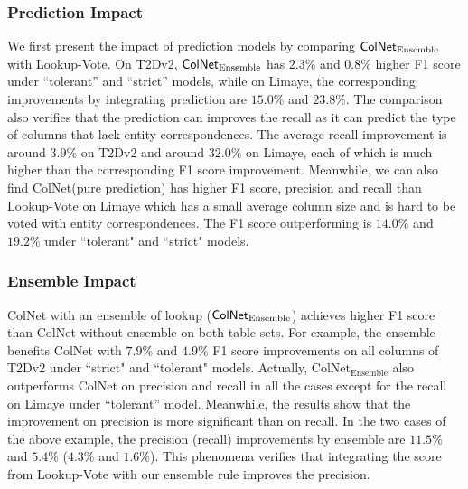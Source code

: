 \documentclass[letterpaper]{article}
\newcommand{\rv}[1]{{\color{black}#1}}
\newcommand{\ColNet}{\textsf{ColNet}\xspace}
\begin{document}
\subsubsection{Prediction Impact} 
\rv{
We first present the impact of prediction models by comparing $\text{\ColNet}_{\text{Ensemble}}$ with Lookup-Vote.
On T2Dv2, $\text{\ColNet}_{\text{Ensemble}}$ has $2.3\%$ and $0.8\%$ higher F1 score under ``tolerant'' and ``strict'' models,
while on Limaye, the corresponding improvements by integrating prediction are $15.0\%$ and $23.8\%$.
The comparison also verifies that the prediction can improves the recall as it can predict the type of columns that lack entity correspondences.
The average recall improvement is around $3.9\%$ on T2Dv2 
and around $32.0\%$ on Limaye,
each of which is much higher than the corresponding F1 score improvement.
}
\rv{
Meanwhile, we can also find \ColNet (pure prediction) has higher F1 score, precision and recall than Lookup-Vote on Limaye which has a small average column size and is hard to be voted with entity correspondences.
The F1 score outperforming is $14.0\%$ and $19.2\%$ under ``tolerant" and ``strict" models. 
}



\subsubsection{Ensemble Impact}
\ColNet with an ensemble of lookup \rv{($\text{\ColNet}_{\text{Ensemble}}$) achieves higher F1 score than \ColNet without ensemble on both table sets.
For example, the ensemble benefits \ColNet with $7.9\%$ and $4.9\%$} F1 score improvements on all columns of T2Dv2 under ``strict" and ``tolerant" models.
\rv{Actually, $\text{ColNet}_{\text{Ensemble}}$ also outperforms \ColNet on precision and recall in all the cases except for the recall on Limaye under ``tolerant'' model.}
\rv{Meanwhile, the results show that the improvement on precision is more significant than on recall.
In the two cases of the above example, 
the precision (recall)  improvements by ensemble are $11.5\%$ and $5.4\%$ ($4.3\%$ and $1.6\%$).
This phenomena verifies that integrating the score from Lookup-Vote with our ensemble rule improves the precision.}
\end{document}

